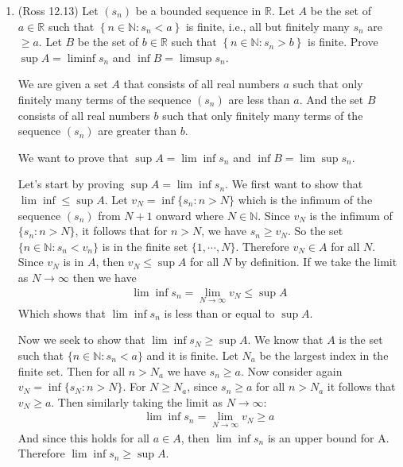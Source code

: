 \documentclass [10pt]{article}
\newcommand{\jg}[1]{{\color{blue} #1}}
\begin{document}
\begin{enumerate}
\item (Ross 12.13)
Let $\left(s_n\right)$ be a bounded sequence in $\mathbb{R}$. Let $A$ be the set of
$a \in \mathbb{R}$ such that $\left\{n \in \mathbb{N}: s_n<a\right\}$ is finite,
i.e., all but finitely many $s_n$ are $\geq a$. Let $B$ be the set of $b \in \mathbb{R}$ such that $\left\{n \in \mathbb{N}: s_n>b\right\}$ is finite. Prove $\sup A=\liminf s_n$ and $\inf B=\limsup s_n$.

\jg{
We are given a set $A$ that consists of all real numbers $a$ such that only finitely  many terms of the sequence $(s_n)$ are less than $a$. And the set $B$ consists of all real numbers $b$ such that only finitely many terms of the sequence $(s_n)$ are greater than $b$. 

We want to prove that $\sup A = \lim \inf s_n$ and $\inf B = \lim \sup s_n$. 

Let's start by proving $\sup A = \lim \inf s_n$. We first want to show that $\lim \inf \leq \sup A$. Let $v_N = \inf \{s_n : n > N \}$ which is the infimum of the sequence $(s_n)$ from $N + 1$ onward where $N \in \mathbb{N}$. Since $v_N$ is the infimum of $\{s_n : n > N \}$, it follows that for $n > N$, we have $s_n \geq v_N$. So the set $\{ n \in \mathbb{N} : s_n < v_n \}$ is in the finite set $\{ 1, \cdots, N \}$. Therefore $v_N \in A$ for all $N$. Since $v_N$ is in $A$, then $v_N \leq \sup A$ for all $N$ by definition. If we take the limit as $N \rightarrow \infty$ then we have 
\begin{align*}
    \lim \inf s_n = \lim_{N \rightarrow \infty} v_N \leq \sup A
\end{align*}
Which shows that $\lim \inf s_n$ is less than or equal to $\sup A$. 

Now we seek to show that $\lim \inf s_N \geq \sup A$. We know that $A$ is the set such that $\{n \in \mathbb{N} : s_n < a \}$ and it is finite. Let $N_a$ be the largest index in the finite set. Then for all $n > N_a$ we have $s_n \geq a$. Now consider again $v_N = \inf \{s_N : n > N\}$. For $N \geq N_a$, since $s_n \geq a$ for all $n > N_a$ it follows that $v_N \geq a$. Then similarly taking the limit as $N \rightarrow \infty$: 
\begin{align*}
    \lim \inf s_n = \lim_{N \rightarrow \infty} v_N \geq a
\end{align*}
And since this holds for all $a \in A$, then $\lim \inf s_n$ is an upper bound for A. Therefore $\lim \inf s_n \geq \sup A$. 

}
\end{enumerate}
\end{document}
